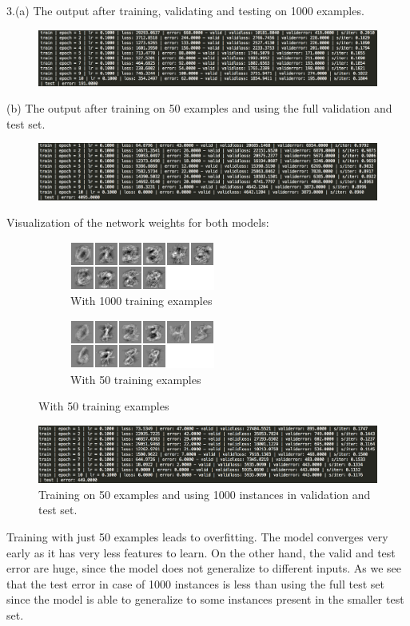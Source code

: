 \documentclass[11pt]{article}
\begin{document}
3.(a) The output after training, validating and testing on 1000 examples.
\begin{figure}[H]
\centering
\includegraphics[scale=0.5]{assign2/torch/output1000.png}
\caption{ \label{fig5}}
\end{figure}
(b) The output after training on 50 examples and using the full validation and test set.
\begin{figure}[H]
\centering
\includegraphics[scale=0.5]{assign2/torch/output50.png}
\caption{ \label{fig6}}
\end{figure}
Visualization of the network weights for both models:
\begin{figure}[H]
\begin{subfigure}{.5\textwidth}
\centering
\includegraphics{assign2/torch/weight_1000.png}
\caption{With 1000 training examples\label{fig3}}
\end{subfigure}
\begin{subfigure}{.5\textwidth}
\centering
\includegraphics{assign2/torch/weight_50.png}
\caption{With 50 training examples\label{fig4}}
\end{subfigure}
\end{figure}
\begin{figure}[H]
\centering
\includegraphics[scale=0.5]{assign2/torch/weight50-1000.png}
\caption{Training on 50 examples and using 1000 instances in validation and test set. \label{fig5}}
\end{figure}
Training with just 50 examples leads to overfitting. The model converges very early as it has very less features to learn. On the other hand, the valid and test error are huge, since the model does not generalize to different inputs. As we see that the test error in case of 1000 instances is less than using the full test set since the model is able to generalize to some instances present in the smaller test set.
\end{document}

